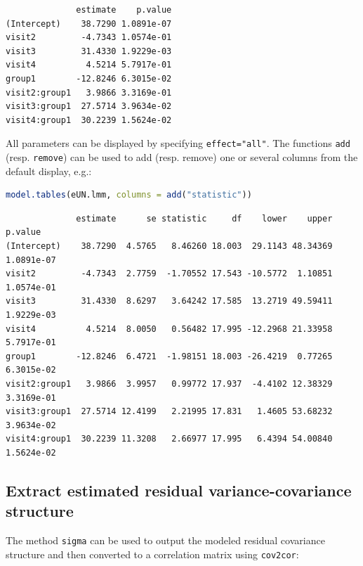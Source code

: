 \documentclass[12pt]{article}
\begin{document}
\label{}
\begin{verbatim}
              estimate    p.value
(Intercept)    38.7290 1.0891e-07
visit2         -4.7343 1.0574e-01
visit3         31.4330 1.9229e-03
visit4          4.5214 5.7917e-01
group1        -12.8246 6.3015e-02
visit2:group1   3.9866 3.3169e-01
visit3:group1  27.5714 3.9634e-02
visit4:group1  30.2239 1.5624e-02
\end{verbatim}


All parameters can be displayed by specifying
\texttt{effect="all"}.  The functions \texttt{add} (resp. \texttt{remove})
can be used to add (resp. remove) one or several columns from the
default display, e.g.:
\begin{lstlisting}[language=r,numbers=none]
model.tables(eUN.lmm, columns = add("statistic"))
\end{lstlisting}

\label{}
\begin{verbatim}
              estimate      se statistic     df    lower    upper    p.value
(Intercept)    38.7290  4.5765   8.46260 18.003  29.1143 48.34369 1.0891e-07
visit2         -4.7343  2.7759  -1.70552 17.543 -10.5772  1.10851 1.0574e-01
visit3         31.4330  8.6297   3.64242 17.585  13.2719 49.59411 1.9229e-03
visit4          4.5214  8.0050   0.56482 17.995 -12.2968 21.33958 5.7917e-01
group1        -12.8246  6.4721  -1.98151 18.003 -26.4219  0.77265 6.3015e-02
visit2:group1   3.9866  3.9957   0.99772 17.937  -4.4102 12.38329 3.3169e-01
visit3:group1  27.5714 12.4199   2.21995 17.831   1.4605 53.68232 3.9634e-02
visit4:group1  30.2239 11.3208   2.66977 17.995   6.4394 54.00840 1.5624e-02
\end{verbatim}
\subsection{Extract estimated residual variance-covariance structure}
\label{sec:orgfe74df8}

The method \texttt{sigma} can be used to output the modeled residual
covariance structure and then converted to a correlation matrix using
\texttt{cov2cor}:

\medskip
\end{document}
